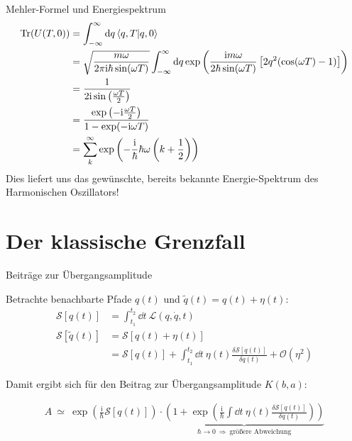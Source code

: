 \begin{frame}{Mehler-Formel und Energiespektrum}
\begin{align*}
\operatorname{Tr}(U(T,0)) &= \int_{-\infty}^{\infty} \dd q \braket{q,T}{q,0}	\\
&=  \sqrt{\frac{m\omega}{2\pi\mathrm{i}\hbar\sin(\omega T)}} \int_{-\infty}^{\infty} \dd q  \exp\left(\frac{\mathrm{i}m\omega}{2\hbar\sin(\omega T)}\left[2q^2(\cos(\omega T)- 1)\right] \right) \\
&= \frac{1}{2\mathrm{i}\sin\left(\frac{\omega T}{2}\right)} \\
&= \frac{\exp\left(-\mathrm{i}\frac{\omega T}{2}\right)}{1-\exp(-\mathrm{i}\omega T)}	\\
&= \sum_k^{\infty} \exp\left(-\frac{\mathrm{i}}{\hbar}\hbar\omega\left(k+\frac{1}{2}\right)\right)
\end{align*}
Dies liefert uns das gewünschte, bereits bekannte Energie-Spektrum des Harmonischen Oszillators!

\end{frame}


\section{Der klassische Grenzfall}
\begin{frame}{Beiträge zur Übergangsamplitude}

Betrachte benachbarte Pfade $q(t)$ und $\tilde{q}(t) = q(t) + \eta(t)$:
\begin{align*}
		\mathcal{S}[q(t)] &= \int_{t_1}^{t_2}  \dd t \ \mathcal{L}(q, \dot{q}, t) \\
		\mathcal{S}[\tilde{q}(t)] &= \mathcal{S}[q(t) + \eta(t)] \\
		&= \mathcal{S}[q(t)] + \int_{t_1}^{t_2} \dd t \  \eta(t)\frac{\delta \mathcal{S}[q(t)]}{\delta q(t)} + \mathcal{O}(\eta^2)	 
\end{align*}

Damit ergibt sich für den Beitrag zur Übergangsamplitude $K(b,a)$: 

\begin{align*}
	A \ \simeq \ \exp(\frac{\mathrm{i}}{\hbar} \mathcal{S}[q(t)])\cdot \underbrace{\left(1+\exp\left(\frac{\mathrm{i}}{\hbar}\int \dd t \ \eta(t) \frac{\delta \mathcal{S}[q(t)]}{\delta q(t)}\right)\right)}_{\hbar \rightarrow 0 \ \Longrightarrow \ \text{größere Abweichung}}
\end{align*}
\end{frame}

